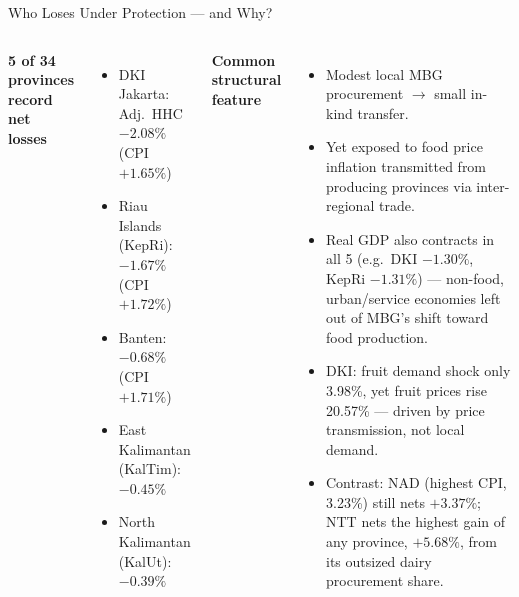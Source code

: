\documentclass[11pt,aspectratio=169]{beamer}
\begin{document}
\begin{frame}{Who Loses Under Protection --- and Why?}
\footnotesize
\begin{columns}[T,onlytextwidth]
	\textbf{5 of 34 provinces record net losses}
	\begin{itemize}\setlength\itemsep{5pt}
		\item DKI Jakarta: Adj.\ HHC $-2.08\%$ (CPI $+1.65\%$)
		\item Riau Islands (KepRi): $-1.67\%$ (CPI $+1.72\%$)
		\item Banten: $-0.68\%$ (CPI $+1.71\%$)
		\item East Kalimantan (KalTim): $-0.45\%$
		\item North Kalimantan (KalUt): $-0.39\%$
	\end{itemize}
	\textbf{Common structural feature}
	\begin{itemize}\setlength\itemsep{4pt}
		\item Modest local MBG procurement $\to$ small in-kind transfer.
		\item Yet exposed to food price inflation transmitted from producing provinces via inter-regional trade.
		\item Real GDP also contracts in all 5 (e.g.\ DKI $-1.30\%$, KepRi $-1.31\%$) --- non-food, urban/service economies left out of MBG's shift toward food production.
		\item DKI: fruit demand shock only 3.98\%, yet fruit prices rise 20.57\% --- driven by price transmission, not local demand.
		\item Contrast: NAD (highest CPI, 3.23\%) still nets $+3.37\%$; NTT nets the highest gain of any province, $+5.68\%$, from its outsized dairy procurement share.
	\end{itemize}
\end{columns}
\end{frame}
\end{document}
